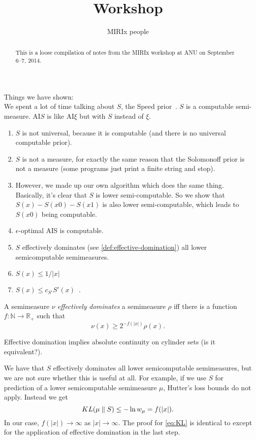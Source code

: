 \documentclass[a4paper]{article}
\title{Workshop}
\author{MIRIx people}
\begin{document}
\maketitle

\begin{abstract}
This is a loose compilation of notes from the MIRIx workshop at ANU on
September 6--7, 2014.
\end{abstract}

Things we have shown:\\

We spent a lot of time talking about $S$, the Speed prior~\cite{Schmidhuber:2002}.
$S$ is a computable semi-measure.
AI$S$ is like AI$\xi$ but with $S$ instead of $\xi$.\\
%
\begin{enumerate}
\item $S$ is not universal, because it is computable (and there is no universal computable prior).
\item $S$ is not a measure, for exactly the same reason that the Solomonoff prior is not a measure
	(some programs just print a finite string and stop).
\item However, we made up our own algorithm which does the same thing. Basically, it's clear that $S$ is lower semi-computable. So we show that $S(x)- S(x0) - S(x1)$ is also lower semi-computable, which leads to $S(x0)$ being computable.
\item $\epsilon$-optimal AIS is computable.
\item $S$ effectively dominates (see \autoref{def:effective-domination}) all lower semicomputable semimeasures.
\item $S(x) \leq 1 / |x|$
\item $S(x) \leq c_{S'} S'(x)$~\cite[Eq.\ 7]{Schmidhuber:2002}.
\end{enumerate}

\begin{definition}
\label{def:effective-domination}
A semimeasure $\nu$ \emph{effectively dominates} a semimeasure $\rho$ iff
there is a function $f: \mathbb{N} \to \mathbb{R}_+$ such that
\[
\nu(x) \geq 2^{-f(|x|)} \rho(x).
\]
\end{definition}

Effective domination implies absolute continuity on cylinder sets
(is it equivalent?).

We have that $S$ effectively dominates all lower semicomputable semimeasures,
but we are not sure whether this is useful at all.
For example, if we use $S$ for prediction of a lower semicomputable semimeasure $\mu$,
Hutter's loss bounds do not apply.
Instead we get
\begin{equation}
\label{eq:KL}
KL(\mu \parallel S) \leq - \ln w_\mu = f(|x|).
\end{equation}
In our case, $f(|x|) \to \infty$ as $|x| \to \infty$.
The proof for \eqref{eq:KL} is identical to \cite[Thm.\ 3.19]{Hutter:2005}
except for the application of effective domination in the last step.
\end{document}
